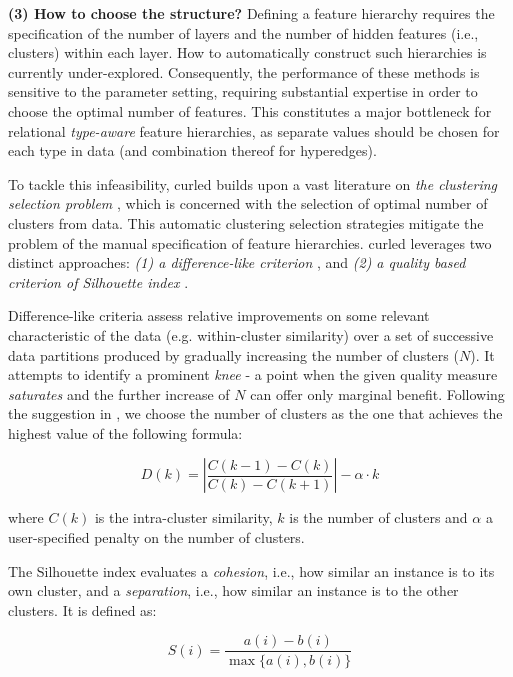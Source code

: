 \textbf{(3) How to choose the structure?}
Defining a feature hierarchy requires the specification of the number of layers and the number of hidden features (i.e., clusters) within each layer.
How to automatically construct such hierarchies is currently under-explored.
Consequently, the performance of these methods is sensitive to the parameter setting, requiring substantial expertise in order to choose the optimal number of features.
This constitutes a major bottleneck for relational \textit{type-aware} feature hierarchies, as separate values should be chosen for each type in data (and combination thereof for hyperedges).

To tackle this infeasibility, \gls{curled} builds upon a vast literature on \textit{the clustering selection problem} \cite{Arbelaitz:2013}, which is concerned with the selection of optimal number of clusters from data.
This automatic clustering selection strategies mitigate the problem of the manual specification of feature hierarchies.
\gls{curled} leverages  two distinct approaches: \textit{(1) a difference-like criterion} \cite{Vendramin:2010}, and \textit{(2) a quality based criterion of Silhouette index} \cite{Rousseeuw:1987}.


Difference-like criteria assess relative improvements on some relevant characteristic of the data (e.g. within-cluster similarity) over a set of successive data partitions produced by gradually increasing the number of clusters ($N$).
It attempts to identify a prominent \textit{knee} - a point when the given quality measure \textit{saturates} and the further increase of $N$ can offer only marginal benefit.
Following the suggestion in \cite{Vendramin:2010}, we choose the number of clusters as the one that achieves the highest value of the following formula:

\begin{equation}
	D(k) = \left| \frac{C(k-1) - C(k)}{C(k) - C(k+1)} \right| - \alpha \cdot k
	\label{eq:Sat}
\end{equation}

where $C(k)$ is the intra-cluster similarity, $k$ is the number of clusters and $\alpha$ a user-specified penalty on the number of clusters.


The Silhouette index evaluates a \textit{cohesion}, i.e., how similar an instance is to its own cluster, and a \textit{separation}, i.e., how similar an instance is to the other clusters.
It is defined as:

\begin{equation}
    S(i) = \frac{a(i) - b(i)}{ \max \{ a(i), b(i)\}}
\end{equation}

